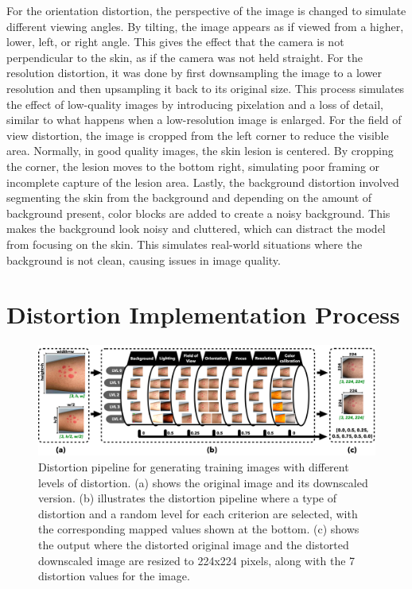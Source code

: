 For the orientation distortion, the perspective of the image is changed to simulate different viewing angles. By tilting, the image appears as if viewed from a higher, lower, left, or right angle. This gives the effect that the camera is not perpendicular to the skin, as if the camera was not held straight. For the resolution distortion, it was done by first downsampling the image to a lower resolution and then upsampling it back to its original size. This process simulates the effect of low-quality images by introducing pixelation and a loss of detail, similar to what happens when a low-resolution image is enlarged. For the field of view distortion, the image is cropped from the left corner to reduce the visible area. Normally, in good quality images, the skin lesion is centered. By cropping the corner, the lesion moves to the bottom right, simulating poor framing or incomplete capture of the lesion area. Lastly, the background distortion involved segmenting the skin from the background and depending on the amount of background present, color blocks are added to create a noisy background. This makes the background look noisy and cluttered, which can distract the model from focusing on the skin. This simulates real-world situations where the background is not clean, causing issues in image quality.\par

\section{Distortion Implementation Process}
\label{sec:DistProcess}

\begin{figure}[ht]
    \centering
    \includegraphics[keepaspectratio,width=15cm]{img/Distortion_pipeline.png}
    \caption{Distortion pipeline for generating training images with different levels of distortion. (a) shows the original image and its downscaled version. (b) illustrates the distortion pipeline where a type of distortion and a random level for each criterion are selected, with the corresponding mapped values shown at the bottom. (c) shows the output where the distorted original image and the distorted downscaled image are resized to 224x224 pixels, along with the 7 distortion values for the image.}
    \label{fig:DistPipeline}
\end{figure}

